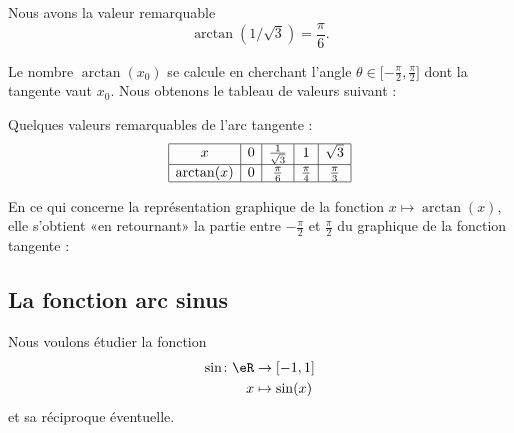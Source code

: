 	\begin{lemma}       \label{LEMooJKIUooEMMOrs}
		Nous avons la valeur remarquable
		\begin{equation}
			\arctan(1/\sqrt{ 3 })=\frac{ \pi }{ 6 }.
		\end{equation}
	\end{lemma}

	Le nombre \( \arctan(x_0)\) se calcule en cherchant l'angle \( \theta\in\mathopen[ -\frac{ \pi }{2} , \frac{ \pi }{2} \mathclose]\) dont la tangente vaut \( x_0\). Nous obtenons le tableau de valeurs suivant :

	\begin{lemma}       \label{LEMooPQNCooDkEUyw}
		Quelques valeurs remarquables de l'arc tangente :
		\begin{equation}
			\begin{array}[]{|c|c|c|c|c|}
				\hline
				x          & 0 & \frac{1}{ \sqrt{3} } & 1                 & \sqrt{3}          \\
				\hline
				\arctan(x) & 0 & \frac{ \pi }{ 6 }    & \frac{ \pi }{ 4 } & \frac{ \pi }{ 3 } \\
				\hline
			\end{array}
		\end{equation}
	\end{lemma}

	En ce qui concerne la représentation graphique de la fonction \( x\mapsto\arctan(x)\), elle s'obtient «en retournant» la partie entre \( -\frac{ \pi }{2}\) et \( \frac{ \pi }{ 2 }\) du graphique de la fonction tangente :
	\begin{center}
		
	\end{center}

	\subsection{La fonction arc sinus}

	Nous voulons étudier la fonction
	\begin{equation}
		\begin{aligned}
			\sin\colon \eR & \to \mathopen[ -1 , 1 \mathclose] \\
			x              & \mapsto \sin(x)
		\end{aligned}
	\end{equation}
	et sa réciproque éventuelle.

